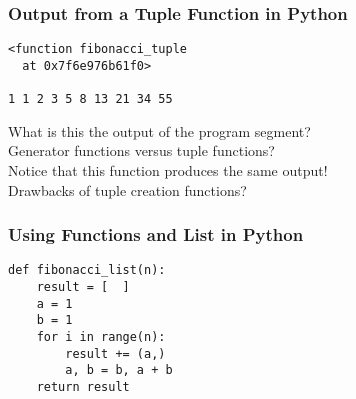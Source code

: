 \documentclass[14pt,aspectratio=169]{beamer}
\begin{document}
%
\begin{frame}[fragile]
  \frametitle{Output from a Tuple Function in Python}
  \normalsize
  \begin{minipage}{6in}
    \vspace*{.1in}
    \begin{verbatim}
<function fibonacci_tuple
  at 0x7f6e976b61f0>

1 1 2 3 5 8 13 21 34 55

    \end{verbatim}
  \vspace*{.05in}
  \begin{center}
    \normalsize \noindent What is this the output of the program segment? \\
    \normalsize \noindent Generator functions versus tuple functions? \\
    \normalsize \noindent Notice that this function produces the same output! \\
    \normalsize \noindent Drawbacks of tuple creation functions? \\
  \end{center}
  \end{minipage}
\end{frame}

%
\begin{frame}[fragile]
  \frametitle{Using Functions and List in Python}
  \normalsize
  \begin{minipage}{6in}
    \vspace*{.1in}
    \begin{verbatim}
def fibonacci_list(n):
    result = [  ]
    a = 1
    b = 1
    for i in range(n):
        result += (a,)
        a, b = b, a + b
    return result
    \end{verbatim}
  \end{minipage}
\end{frame}
\end{document}
